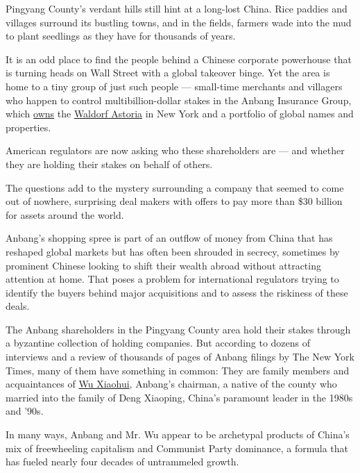 Pingyang County's verdant hills still hint at a long-lost China. Rice
paddies and villages surround its bustling towns, and in the fields,
farmers wade into the mud to plant seedlings as they have for thousands
of years.

It is an odd place to find the people behind a Chinese corporate
powerhouse that is turning heads on Wall Street with a global takeover
binge. Yet the area is home to a tiny group of just such people ---
small-time merchants and villagers who happen to control
multibillion-dollar stakes in the Anbang Insurance Group, which
\href{http://dealbook.nytimes.com/2014/10/08/chinese-return-to-the-waldorf-with-2-billion/}{owns}
the
\href{http://www.nytimes.com/2016/07/24/nyregion/chasing-waldorfs-history-as-it-becomes-history-itself.html}{Waldorf
Astoria} in New York and a portfolio of global names and properties.

American regulators are now asking who these shareholders are --- and
whether they are holding their stakes on behalf of others.

The questions add to the mystery surrounding a company that seemed to
come out of nowhere, surprising deal makers with offers to pay more than
\$30 billion for assets around the world.

Anbang's shopping spree is part of an outflow of money from China that
has reshaped global markets but has often been shrouded in secrecy,
sometimes by prominent Chinese looking to shift their wealth abroad
without attracting attention at home. That poses a problem for
international regulators trying to identify the buyers behind major
acquisitions and to assess the riskiness of these deals.

The Anbang shareholders in the Pingyang County area hold their stakes
through a byzantine collection of holding companies. But according to
dozens of interviews and a review of thousands of pages of Anbang
filings by The New York Times, many of them have something in common:
They are family members and acquaintances of
\href{http://www.nytimes.com/2016/03/30/business/dealbook/china-anbang-starwood-wu-xiaohui.html}{Wu
Xiaohui}, Anbang's chairman, a native of the county who married into the
family of Deng Xiaoping, China's paramount leader in the 1980s and '90s.

In many ways, Anbang and Mr. Wu appear to be archetypal products of
China's mix of freewheeling capitalism and Communist Party dominance, a
formula that has fueled nearly four decades of untrammeled growth.


